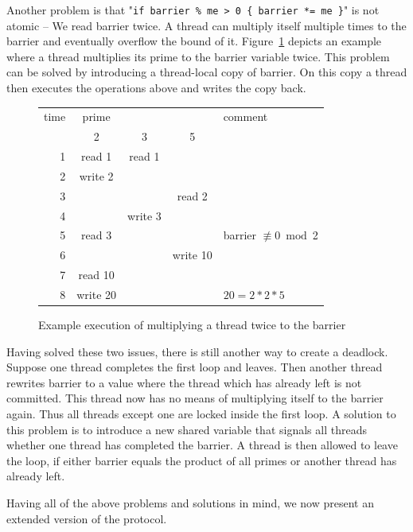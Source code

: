 \documentclass[a4paper, 10pt]{article}
\begin{document}
Another problem is that "\texttt{if~barrier~\%~me~>~0~\{~barrier~*=~me~\}}" is not atomic -- We read barrier twice. A thread can multiply itself multiple times to the barrier and eventually overflow the bound of it. Figure~\ref{fig:deadlock1} depicts an example where a thread multiplies its prime to the barrier variable twice. This problem can be solved by introducing a thread-local copy of barrier. On this copy a thread then executes the operations above and writes the copy back.
\begin{figure}[htbp]
	\centering
	\begin{tabular}{r | c c c | l}
		time & prime    &         &          & comment \\
			 & 2        & 3       & 5        &         \\
		\hline
		1    & read 1   & read 1  &          &         \\
		2    & write 2  &         &          &         \\
		3    &          &         & read 2   &         \\
		4    &          & write 3 &          &         \\
		5    & read 3   &         &          & barrier $\not\equiv 0 \bmod{}$2 \\
		6    &          &         & write 10 &         \\
		7    & read 10  &         &          &         \\
		8    & write 20 &         &          & $20 = 2 * 2 * 5$ \\
	\end{tabular}
	\caption{Example execution of multiplying a thread twice to the barrier}
	\label{fig:deadlock1}
\end{figure}

Having solved these two issues, there is still another way to create a deadlock. Suppose one thread completes the first loop and leaves. Then another thread rewrites barrier to a value where the thread which has already left is not committed. This thread now has no means of multiplying itself to the barrier again. Thus all threads except one are locked inside the first loop. A solution to this problem is to introduce a new shared variable that signals all threads whether one thread has completed the barrier. A thread is then allowed to leave the loop, if either barrier equals the product of all primes or another thread has already left.

Having all of the above problems and solutions in mind, we now present an extended version of the protocol.
\end{document}
